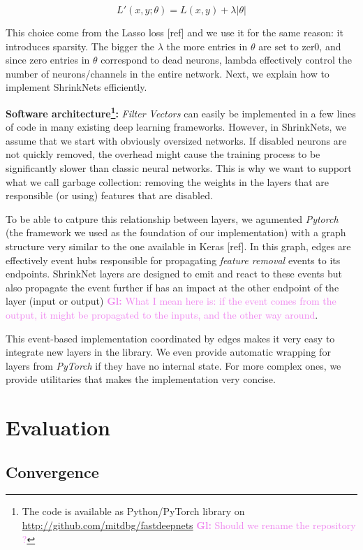 \documentclass[sigconf]{acmart}
\newcommand{\gl}[1]{\textcolor{violet}{{\bf Gl:} #1}}
\begin{document}
\begin{equation}
  L'(x,y;\theta) = L(x, y) + \lambda|\theta|
\end{equation}

This choice come from the Lasso loss [ref] and we use it for the same reason:
it introduces sparsity. The bigger the $\lambda$ the more entries in $\theta$
are set to zer0, and since zero entries in $\theta$ correspond to dead neurons,
lambda effectively control the number of neurons/channels in the entire
network.
Next, we explain how to implement ShrinkNets efficiently.

\textbf{Software architecture\footnote{The code is available as Python/PyTorch
    library on \url{http://github.com/mitdbg/fastdeepnets} \gl{Should we rename
      the repository ?}}: }\textit{Filter Vectors} can easily be implemented in
a few lines of code in many existing deep learning frameworks. However, in
ShrinkNets, we assume that we start with obviously oversized networks. If
disabled neurons are not quickly removed, the overhead might cause the training
process to be significantly slower than classic neural networks. This is why we
want to support what we call garbage collection: removing the weights in the
layers that are responsible (or using) features that are disabled.  \par To be
able to catpure this relationship between layers, we agumented \textit{Pytorch}
(the framework we used as the foundation of our implementation) with a graph
structure very similar to the one available in Keras [ref].  In this graph,
edges are effectively event hubs responsible for propagating \textit{feature
  removal} events to its endpoints. ShrinkNet layers are designed to emit and
react to these events but also propagate the event further if has an impact at
the other endpoint of the layer (input or output) \gl{What I mean here is: if
  the event comes from the output, it might be propagated to the inputs, and
  the other way around}.  \par This event-based implementation coordinated by
edges makes it very easy to integrate new layers in the library. We even
provide automatic wrapping for layers from \textit{PyTorch} if they have no
internal state. For more complex ones, we provide utilitaries that makes the
implementation very concise.

\section{Evaluation}
\subsection{Convergence}
\end{document}
